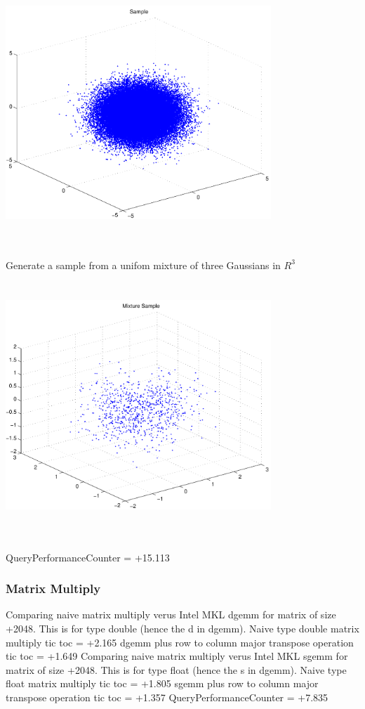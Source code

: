 \documentclass[9pt]{article}
\theoremstyle{plain}
\theoremstyle{definition}
\theoremstyle{remark}
\numberwithin{equation}{section}
\begin{document}
\includegraphics[width=10.0cm,height=10.0cm]{R_3_Normal.pdf}

Generate a sample from a unifom mixture of three Gaussians in $R^3$
\includegraphics[width=10.0cm,height=10.0cm]{R_3_Normal_Mixture.pdf}

QueryPerformanceCounter  =  +15.113
\subsubsection{Matrix Multiply}
Comparing naive matrix multiply verus Intel MKL dgemm for matrix of size +2048.
This is for type double (hence the d in dgemm).
Naive type double matrix multiply tic toc  =  +2.165
dgemm plus row to column major transpose operation tic toc  =  +1.649
Comparing naive matrix multiply verus Intel MKL sgemm for matrix of size +2048.
This is for type float (hence the s in dgemm).
Naive type float matrix multiply tic toc  =  +1.805
sgemm plus row to column major transpose operation tic toc  =  +1.357
QueryPerformanceCounter  =  +7.835
\end{document}
